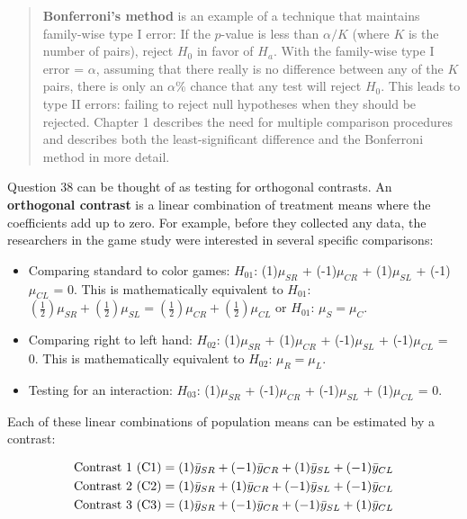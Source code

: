 \documentclass[
]{report}
\providecommand{\tightlist}{%
  \setlength{\itemsep}{0pt}\setlength{\parskip}{0pt}}
\begin{document}
\begin{quote}
\textbf{Bonferroni's method} is an example of a technique that maintains family-wise type I error: If the \(\scriptstyle p\)-value is less than \(\scriptstyle \alpha/K\) (where \(\scriptstyle K\) is the number of pairs), reject \(\scriptstyle H_0\) in favor of \(\scriptstyle H_a\). With the family-wise type I error = \(\scriptstyle \alpha\), assuming that there really is no difference between any of the \(K\) pairs, there is only an \(\scriptstyle \alpha\)\% chance that any test will reject \(\scriptstyle H_0\). This leads to type II errors: failing to reject null hypotheses when they should be rejected. Chapter 1 describes the need for multiple comparison procedures and describes both the least-significant difference and the Bonferroni method in more detail.
\end{quote}

Question 38 can be thought of as testing for orthogonal contrasts. An \textbf{orthogonal contrast} is a linear combination of treatment means where the coefficients add up to zero. For example, before they collected any data, the researchers in the game study were interested in several specific comparisons:

\begin{itemize}
\tightlist
\item
  Comparing standard to color games: \(\scriptstyle H_{01}\): (1)\(\mu_{SR}\) + (-1)\(\mu_{CR}\) + (1)\(\mu_{SL}\) + (-1)\(\mu_{CL}\) = 0. This is mathematically equivalent to \(\scriptstyle H_{01}\): \((\frac{1}{2})\mu_{SR} + (\frac{1}{2})\mu_{SL} = (\frac{1}{2})\mu_{CR} + (\frac{1}{2})\mu_{CL}\) or \(H_{01}\): \(\mu_{S} = \mu_{C}\).
\item
  Comparing right to left hand: \(\scriptstyle H_{02}\): (1)\(\mu_{SR}\) + (1)\(\mu_{CR}\) + (-1)\(\mu_{SL}\) + (-1)\(\mu_{CL}\) = 0. This is mathematically equivalent to \(\scriptstyle H_{02}\): \(\mu_{R} = \mu_{L}\).
\item
  Testing for an interaction: \(\scriptstyle H_{03}\): (1)\(\mu_{SR}\) + (-1)\(\mu_{CR}\) + (-1)\(\mu_{SL}\) + (1)\(\mu_{CL}\) = 0.
\end{itemize}

Each of these linear combinations of population means can be estimated by a contrast:

\begin{align}
\text{Contrast 1 (C1)} &= (1)\bar{y}_{SR} + (-1)\bar{y}_{CR} + (1)\bar{y}_{SL} + (-1)\bar{y}_{CL} \notag \\
\text{Contrast 2 (C2)} &= (1)\bar{y}_{SR} + (1)\bar{y}_{CR} + (-1)\bar{y}_{SL} + (-1)\bar{y}_{CL} \notag \\
\text{Contrast 3 (C3)} &= (1)\bar{y}_{SR} + (-1)\bar{y}_{CR} + (-1)\bar{y}_{SL} + (1)\bar{y}_{CL}
\notag
\end{align}
\end{document}

